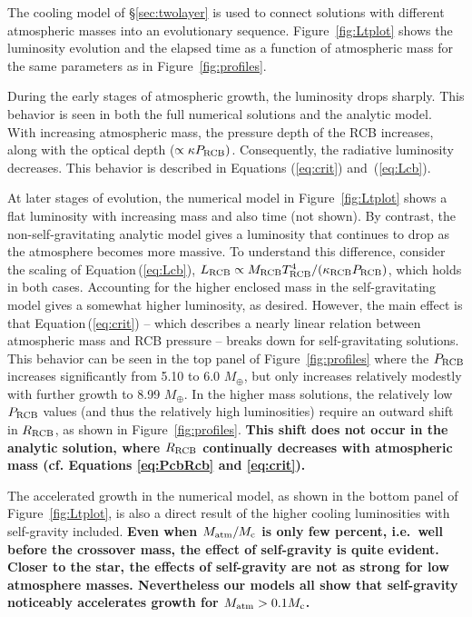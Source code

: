 \documentclass[apj, numberedappendix]{emulateapj}
\newcommand{\Eq}[1]{Equation\,(\ref{#1})}
\newcommand{\Eqs}[2]{Equations (\ref{#1}) and~(\ref{#2})}
\newcommand{\Fig}[1]{Figure~\ref{#1}}
\newcommand{\co}{_{\rm c}}
\newcommand{\cb}{_{\rm RCB}}
\begin{document}
The cooling model of \S\ref{sec:twolayer} is used to connect solutions with different atmospheric masses into an evolutionary sequence.  \Fig{fig:Ltplot} shows the luminosity evolution and the elapsed time as a function of atmospheric mass for the same parameters as in \Fig{fig:profiles}.

During the early stages of atmospheric growth, the luminosity drops sharply.  This behavior is seen in both the full numerical solutions and the analytic model.  With increasing atmospheric mass, the pressure depth of the RCB increases, along with the optical depth ($\propto \kappa P\cb)$.  Consequently, the radiative luminosity decreases.  This behavior is described in \Eqs{eq:crit}{eq:Lcb}.

At later stages of evolution, the numerical model in \Fig{fig:Ltplot} shows a flat luminosity with increasing mass and also time (not shown).  By contrast, the non-self-gravitating analytic model gives a luminosity that continues to drop as the atmosphere becomes more massive.  To understand this difference, consider the scaling of \Eq{eq:Lcb}, $L\cb \propto M\cb T\cb^4/ (\kappa\cb  P\cb)$, which holds in both cases.   Accounting for the higher enclosed mass in the self-gravitating model gives a somewhat higher luminosity, as desired.  However, the main effect is that \Eq{eq:crit} -- which describes a nearly linear relation between atmospheric mass and RCB pressure --  breaks down for self-gravitating solutions.  This behavior can be seen in the top panel of \Fig{fig:profiles} where the $P\cb$ increases significantly from 5.10 to 6.0 $M_\oplus$, but only increases relatively modestly with further growth to 8.99 $M_\oplus$.   In the higher mass solutions, the relatively low $P\cb$ values (and thus the relatively high luminosities) require an outward shift in $R\cb$, as shown in \Fig{fig:profiles}. \textbf{This shift does not occur in the analytic solution, where $R\cb$ continually decreases with atmospheric mass (cf. Equations \ref{eq:PcbRcb} and \ref{eq:crit}).}

The accelerated growth in the numerical model, as shown in the bottom panel of \Fig{fig:Ltplot}, is also a direct result of the higher cooling luminosities with self-gravity included.  \textbf{Even when $M_{\rm atm} / M\co$ is only few percent, i.e.\ well before the crossover mass, the effect of self-gravity is  quite evident.  Closer to the star, the effects of self-gravity are not as strong for low atmosphere masses.  Nevertheless our models all show that self-gravity noticeably accelerates growth for $M_{\rm atm} > 0.1 M\co$.}
\end{document}
